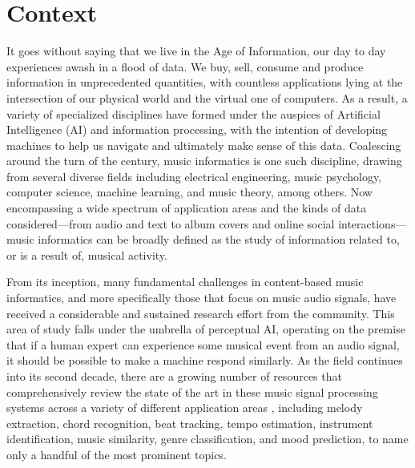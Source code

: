 

\graphicspath{{2/figures/}}

\chapter{Context}
\label{chp:context}


It goes without saying that we live in the Age of Information, our day to day experiences awash in a flood of data.
We buy, sell, consume and produce information in unprecedented quantities, with countless applications lying at the intersection of our physical world and the virtual one of computers. 
As a result, a variety of specialized disciplines have formed under the auspices of Artificial Intelligence (AI) and information processing, with the intention of developing machines to help us navigate and ultimately make sense of this data.
Coalescing around the turn of the century, music informatics is one such discipline, drawing from several diverse fields including electrical engineering, music psychology, computer science, machine learning, and music theory, among others.
Now encompassing a wide spectrum of application areas and the kinds of data considered---from audio and text to album covers and online social interactions---music informatics can be broadly defined as the study of information related to, or is a result of, musical activity.


From its inception, many fundamental challenges in content-based music informatics, and more specifically those that focus on music audio signals, have received a considerable and sustained research effort from the community. 
This area of study falls under the umbrella of perceptual AI, operating on the premise that if a human expert can experience some musical event from an audio signal, it should be possible to make a machine respond similarly.
As the field continues into its second decade, there are a growing number of resources that comprehensively review the state of the art in these music signal processing systems across a variety of different application areas  \cite{Klapuri2006,Casey2008,Mueller2011a}, including melody extraction, chord recognition, beat tracking, tempo estimation, instrument identification, music similarity, genre classification, and mood prediction, to name only a handful of the most prominent topics.

